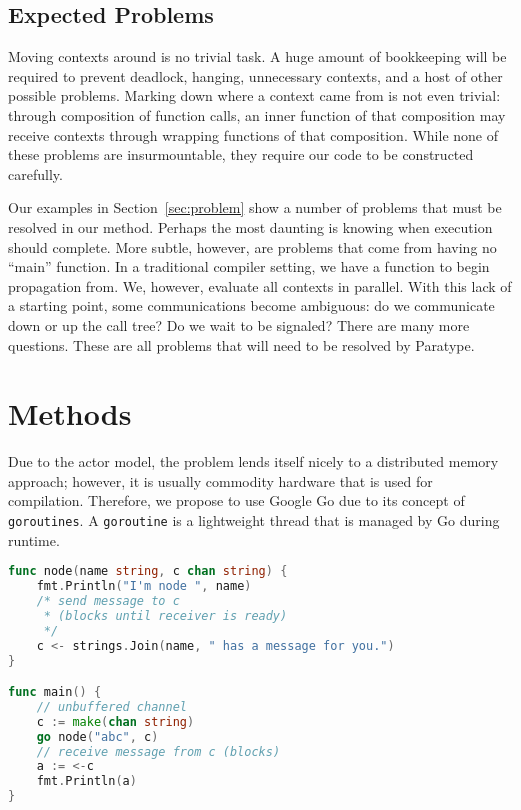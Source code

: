 \documentclass{acm_proc_article-sp}
\begin{document}
\subsection{Expected Problems}

Moving contexts around is no trivial task. A huge amount of
bookkeeping will be required to prevent deadlock, hanging, unnecessary
contexts, and a host of other possible problems. Marking down where a
context came from is not even trivial: through composition of
function calls, an inner function of that composition may receive
contexts through wrapping functions of that composition. While none of
these problems are insurmountable, they require our code to be
constructed carefully.

Our examples in Section~\ref{sec:problem} show a number of problems that must be
resolved in our method. Perhaps the most daunting is knowing when
execution should complete. More subtle, however, are problems that
come from having no ``main'' function. In a traditional compiler
setting, we have a function to begin propagation from. We, however,
evaluate all contexts in parallel. With this lack of a starting point,
some communications become ambiguous: do we communicate down or up
the call tree? Do we wait to be signaled? There are many more questions. These
are all problems that will need to be resolved by Paratype.

\section{Methods}


Due to the actor model, the problem lends itself nicely to a distributed memory
approach; however, it is usually commodity hardware that is used for
compilation. Therefore, we propose to use Google Go due to its concept of
\texttt{goroutines}. A \texttt{goroutine} is a lightweight thread that is
managed by Go during runtime.

\begin{lstlisting}[caption=Small \texttt{goroutine} example with
\texttt{channels},language=Go,label=lst:goroutine]
func node(name string, c chan string) {
	fmt.Println("I'm node ", name)
	/* send message to c 
	 * (blocks until receiver is ready)
	 */
	c <- strings.Join(name, " has a message for you.")
}

func main() {
	// unbuffered channel
	c := make(chan string)
	go node("abc", c)
	// receive message from c (blocks)
	a := <-c
	fmt.Println(a)
}
\end{lstlisting}
\end{document}
